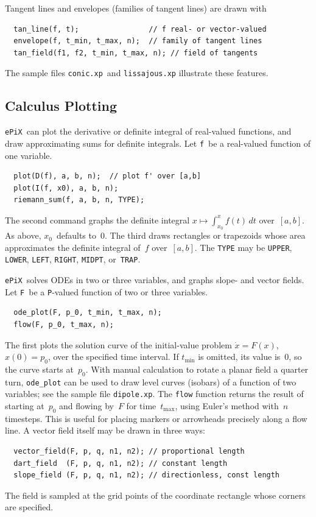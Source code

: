 \documentclass[12pt]{report}
\newcommand{\code}[1]{\texttt{#1}}
\newcommand{\filename}[1]{\texttt{#1}}
\newcommand{\ePiX}{\code{ePiX}}
\begin{document}
Tangent lines and envelopes (families of tangent lines) are drawn with
\begin{verbatim}
  tan_line(f, t);                // f real- or vector-valued
  envelope(f, t_min, t_max, n);  // family of tangent lines
  tan_field(f1, f2, t_min, t_max, n); // field of tangents
\end{verbatim}
The sample files \filename{conic.xp}~and \filename{lissajous.xp}
illustrate these features.


\subsection*{Calculus Plotting} 

\ePiX\ can plot the derivative or definite integral of real-valued
functions, and draw approximating sums for definite integrals. Let
\code{f}~be a real-valued function of one variable.
\begin{verbatim}
  plot(D(f), a, b, n);  // plot f' over [a,b]
  plot(I(f, x0), a, b, n);
  riemann_sum(f, a, b, n, TYPE);
\end{verbatim}
The second command graphs the definite integral $x\mapsto\int_{x_0}^x
f(t)\,dt$ over~$[a,b]$. As above, $x_0$~defaults to~0. The third
draws rectangles or trapezoids whose area approximates the definite
integral of~$f$ over~$[a,b]$. The \code{TYPE} may be \code{UPPER},
\code{LOWER}, \code{LEFT}, \code{RIGHT}, \code{MIDPT},
or~\code{TRAP}.

\ePiX\ solves ODEs in two or three variables, and graphs slope- and
vector fields. Let \code{F}~be a \code{P}-valued function of two or
three variables.
\begin{verbatim}
  ode_plot(F, p_0, t_min, t_max, n); 
  flow(F, p_0, t_max, n);
\end{verbatim}
The first plots the solution curve of the initial-value problem
$\dot{x}=F(x)$, $x(0)=p_0$, over the specified time interval.  If
$t_\mathrm{min}$ is omitted, its value is~0, so the curve starts
at~$p_0$. With manual calculation to rotate a planar field a quarter
turn, \code{ode\_plot} can be used to draw level curves (isobars) of a
function of two variables; see the sample file
\filename{dipole.xp}. The \code{flow} function returns the result of
starting at~$p_0$ and flowing by~$F$ for time~$t_\mathrm{max}$, using
Euler's method with~$n$ timesteps.  This is useful for placing markers
or arrowheads precisely along a flow line. A vector field itself may
be drawn in three ways:
\begin{verbatim}
  vector_field(F, p, q, n1, n2); // proportional length
  dart_field  (F, p, q, n1, n2); // constant length
  slope_field (F, p, q, n1, n2); // directionless, const length
\end{verbatim}
The field is sampled at the grid points of the coordinate rectangle
whose corners are specified.
\end{document}
